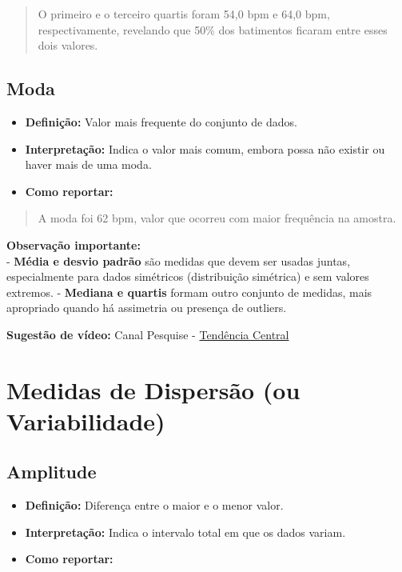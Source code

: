 \documentclass[
]{book}
\providecommand{\tightlist}{%
  \setlength{\itemsep}{0pt}\setlength{\parskip}{0pt}}
\begin{document}
\begin{quote}
O primeiro e o terceiro quartis foram 54,0 bpm e 64,0 bpm, respectivamente, revelando que 50\% dos batimentos ficaram entre esses dois valores.
\end{quote}

\subsection{Moda}\label{moda}

\begin{itemize}
\tightlist
\item
  \textbf{Definição:} Valor mais frequente do conjunto de dados.\\
\item
  \textbf{Interpretação:} Indica o valor mais comum, embora possa não existir ou haver mais de uma moda.\\
\item
  \textbf{Como reportar:}
\end{itemize}

\begin{quote}
A moda foi 62 bpm, valor que ocorreu com maior frequência na amostra.
\end{quote}

\textbf{Observação importante:}\\
- \textbf{Média e desvio padrão} são medidas que devem ser usadas juntas, especialmente para dados simétricos (distribuição simétrica) e sem valores extremos.
- \textbf{Mediana e quartis} formam outro conjunto de medidas, mais apropriado quando há assimetria ou presença de outliers.

\textbf{Sugestão de vídeo:} Canal Pesquise - \href{https://youtu.be/ot0aDB-grDY}{Tendência Central}

\section{Medidas de Dispersão (ou Variabilidade)}\label{medidas-de-dispersuxe3o-ou-variabilidade}

\subsection{Amplitude}\label{amplitude}

\begin{itemize}
\tightlist
\item
  \textbf{Definição:} Diferença entre o maior e o menor valor.\\
\item
  \textbf{Interpretação:} Indica o intervalo total em que os dados variam.\\
\item
  \textbf{Como reportar:}
\end{itemize}
\end{document}
